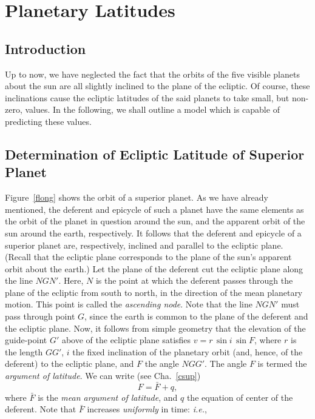 \chapter{Planetary Latitudes}
\section{Introduction}
Up to now, we have neglected the fact that  the orbits of the
five visible planets about the sun are all slightly inclined to the plane of the ecliptic. Of course, these inclinations cause
the ecliptic latitudes of the said planets to take small, but non-zero, values. 
In the following, we shall outline a model which is capable of predicting these values.

\section{Determination of Ecliptic Latitude of Superior Planet}
Figure~\ref{flong} shows the orbit of a superior planet. 
As we have already mentioned, the deferent and epicycle of such a planet have the same elements as 
the orbit of the planet in question  around the sun, and the apparent orbit of the
sun around the earth, respectively. It follows that  the deferent and epicycle of a
superior planet are, respectively,  inclined  and parallel to the ecliptic plane.
 (Recall that the ecliptic plane corresponds to the
plane of the sun's apparent orbit about the earth.) Let the plane of the deferent cut the
ecliptic plane along the line $NGN'$. Here, $N$ is the point at which the
deferent passes through the  plane of the ecliptic from south to north, in the direction of the
mean planetary motion. This point is called the {\em ascending node}. 
Note that the line $NGN'$ must pass through point $G$, since the
earth is common to the plane of the deferent and the ecliptic plane.
Now, it follows from simple geometry that the elevation of the guide-point $G'$ above of the
ecliptic plane satisfies $v= r\,\sin i\,\sin F$, where $r$ is the length $GG'$, $i$  the fixed inclination of the
planetary orbit (and, hence, of the deferent) to the ecliptic plane, and $F$  the angle $NGG'$. The
angle $F$ is termed the {\em argument of latitude}. We can write (see Cha.~\ref{csup})
\begin{equation}
F = \bar{F} + q,
\end{equation}
where $\bar{F}$ is the {\em mean argument of latitude}, and $q$ the equation of center of the deferent. Note that $\bar{F}$
increases {\em uniformly}\/ in time: {\em i.e.},
